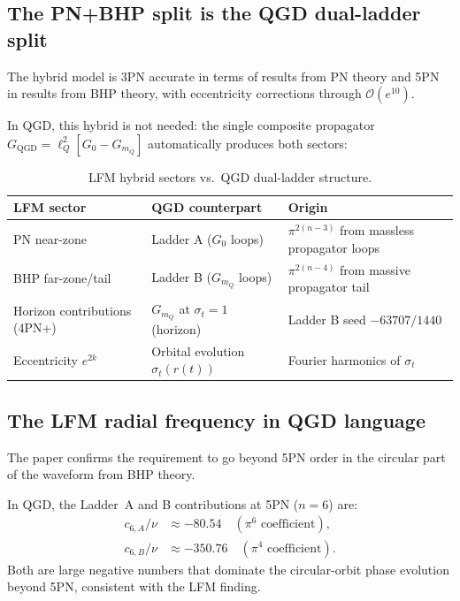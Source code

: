 \documentclass[11pt,a4paper]{article}
\theoremstyle{plain}
\theoremstyle{definition}
\theoremstyle{remark}
\newcommand{\lQ}{\ell_Q}
\newcommand{\mQ}{m_Q}
\begin{document}
\subsection{The PN+BHP split is the QGD dual-ladder split}

The hybrid model is 3PN accurate in terms of results from PN theory and 5PN
in results from BHP theory, with eccentricity corrections through $\mathcal{O}(e^{10})$.

In QGD, this hybrid is not needed: the single composite propagator
$G_{\mathrm{QGD}} = \lQ^2[G_0 - G_{\mQ}]$ automatically produces both sectors:

\begin{table}[h]
\centering
\renewcommand{\arraystretch}{1.3}
\caption{LFM hybrid sectors vs.\ QGD dual-ladder structure.}
\label{tab:LFM_vs_QGD}
\begin{tabular}{@{}p{4cm}p{4.5cm}p{5cm}@{}}
\toprule
LFM sector & QGD counterpart & Origin \\
\midrule
PN near-zone & Ladder A ($G_0$ loops) &
  $\pi^{2(n-3)}$ from massless propagator loops \\
BHP far-zone/tail & Ladder B ($G_{\mQ}$ loops) &
  $\pi^{2(n-4)}$ from massive propagator tail \\
Horizon contributions (4PN+) &
  $G_{\mQ}$ at $\sigma_t = 1$ (horizon) &
  Ladder B seed $-63707/1440$ \\
Eccentricity $e^{2k}$ &
  Orbital evolution $\sigma_t(r(t))$ &
  Fourier harmonics of $\sigma_t$ \\
\bottomrule
\end{tabular}
\end{table}

\subsection{The LFM radial frequency in QGD language}

The paper confirms the requirement to go beyond 5PN order in the circular part
of the waveform from BHP theory.

In QGD, the Ladder~A and B contributions at 5PN ($n=6$) are:
\begin{align}
  c_{6,A}/\nu &\approx -80.54 \quad(\pi^6\text{ coefficient}),\\
  c_{6,B}/\nu &\approx -350.76 \quad(\pi^4\text{ coefficient}).
\end{align}
Both are large negative numbers that dominate the circular-orbit phase evolution
beyond 5PN, consistent with the LFM finding.
\end{document}
